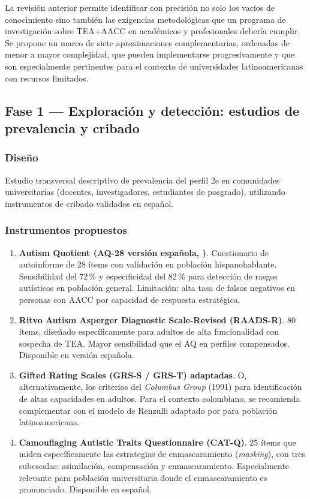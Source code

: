 La revisión anterior permite identificar con precisión no solo los vacíos
de conocimiento sino también las exigencias metodológicas que un programa
de investigación sobre TEA+AACC en académicos y profesionales debería cumplir.
Se propone un marco de siete aproximaciones complementarias, ordenadas de menor
a mayor complejidad, que pueden implementarse progresivamente y que son
especialmente pertinentes para el contexto de universidades latinoamericanas con
recursos limitados.

\subsection{Fase 1 — Exploración y detección: estudios de prevalencia y cribado}

\subsubsection{Diseño}

Estudio transversal descriptivo de prevalencia del perfil 2e en comunidades
universitarias (docentes, investigadores, estudiantes de posgrado), utilizando
instrumentos de cribado validados en español.

\subsubsection{Instrumentos propuestos}

\begin{enumerate}[leftmargin=*, label=\textbf{\arabic*.}, itemsep=3pt]
    \item \textbf{Autism Quotient (AQ-28 versión española, \textcite{baron-cohen2001})}.
    Cuestionario de autoinforme de 28 ítems con validación en población hispanohablante.
    Sensibilidad del 72\,\% y especificidad del 82\,\% para detección de rasgos
    autísticos en población general. Limitación: alta tasa de falsos negativos en
    personas con AACC por capacidad de respuesta estratégica.

    \item \textbf{Ritvo Autism Asperger Diagnostic Scale-Revised (RAADS-R)}.
    80 ítems, diseñado específicamente para adultos de alta funcionalidad con
    sospecha de TEA. Mayor sensibilidad que el AQ en perfiles compensados.
    Disponible en versión española.

    \item \textbf{Gifted Rating Scales (GRS-S / GRS-T) adaptadas}.
    O, alternativamente, los criterios del \textit{Columbus Group} (1991) para
    identificación de altas capacidades en adultos. Para el contexto colombiano,
    se recomienda complementar con el modelo de Renzulli adaptado por
    \textcite{gonzalez2010} para población latinoamericana.

    \item \textbf{Camouflaging Autistic Traits Questionnaire (CAT-Q)}.
    25 ítems que miden específicamente las estrategias de enmascaramiento
    (\textit{masking}), con tres subescalas: asimilación, compensación y enmascaramiento.
    Especialmente relevante para población universitaria donde el enmascaramiento
    es pronunciado. Disponible en español.
\end{enumerate}

